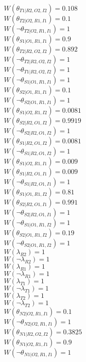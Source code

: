 $W(\theta_{T1|R2,O2,I2})=0.108$\\
$W(\theta_{T2|O2,R1,I1})=0.1$\\
$W(\neg\theta_{T2|O2,R1,I1})=1$\\
$W(\theta_{S1|O1,R1,I1})=0.9$\\
$W(\theta_{T2|R2,O2,I2})=0.892$\\
$W(\neg\theta_{T2|R2,O2,I2})=1$\\
$W(\neg\theta_{T1|R2,O2,I2})=1$\\
$W(\neg\theta_{S1|O1,R1,I1})=1$\\
$W(\theta_{S2|O1,R1,I1})=0.1$\\
$W(\neg\theta_{S2|O1,R1,I1})=1$\\
$W(\theta_{S1|O2,R1,I2})=0.0081$\\
$W(\theta_{S2|R2,O1,I2})=0.9919$\\
$W(\neg\theta_{S2|R2,O1,I2})=1$\\
$W(\theta_{S1|R2,O1,I2})=0.0081$\\
$W(\neg\theta_{S1|R2,O1,I2})=1$\\
$W(\theta_{S1|O2,R1,I1})=0.009$\\
$W(\theta_{S1|R2,O1,I1})=0.009$\\
$W(\neg\theta_{S1|R2,O1,I1})=1$\\
$W(\theta_{S1|O1,R1,I2})=0.81$\\
$W(\theta_{S2|R2,O1,I1})=0.991$\\
$W(\neg\theta_{S2|R2,O1,I1})=1$\\
$W(\neg\theta_{S1|O1,R1,I2})=1$\\
$W(\theta_{S2|O1,R1,I2})=0.19$\\
$W(\neg\theta_{S2|O1,R1,I2})=1$\\
$W(\lambda_{R2})=1$\\
$W(\neg\lambda_{R2})=1$\\
$W(\lambda_{R1})=1$\\
$W(\neg\lambda_{R1})=1$\\
$W(\lambda_{T1})=1$\\
$W(\neg\lambda_{T1})=1$\\
$W(\lambda_{T2})=1$\\
$W(\neg\lambda_{T2})=1$\\
$W(\theta_{N2|O2,R1,I1})=0.1$\\
$W(\neg\theta_{N2|O2,R1,I1})=1$\\
$W(\theta_{N1|R2,O2,I2})=0.3825$\\
$W(\theta_{N1|O2,R1,I1})=0.9$\\
$W(\neg\theta_{N1|O2,R1,I1})=1$\\

